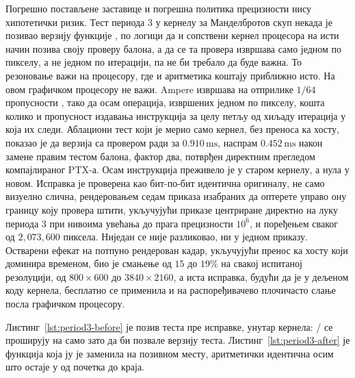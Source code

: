 \documentclass[serbian]{ftndiplomski}
\begin{document}
Погрешно постављене заставице и погрешна политика прецизности нису хипотетички ризик.
Тест периода 3 у  кернелу за Манделбротов скуп некада је позивао 
верзију функције , по логици да и сопствени  кернел
процесора на исти начин позива своју  проверу балона, а да се та провера
извршава само једном по пикселу, а не једном по итерацији, па не би требало да буде
важна. То резоновање важи на процесору, где  и  аритметика коштају
приближно исто. На овом графичком процесору не важи. Ampere извршава  на
отприлике $1/64$ пропусности , тако да осам  операција, извршених
једном по пикселу, кошта колико и пропусност издавања инструкција за целу петљу од
хиљаду итерација у  која их следи. Аблациони тест који је мерио само кернел,
без преноса ка хосту, показао је да верзија са  провером ради за
$0.910\,\mathrm{ms}$, наспрам $0.452\,\mathrm{ms}$ након замене правим 
тестом балона, фактор два, потврђен директним прегледом компајлираног PTX-а. Осам
 инструкција преживело је у старом кернелу, а нула у новом. Исправка је
проверена као бит-по-бит идентична оригиналу, не само визуелно слична, рендеровањем
седам приказа изабраних да оптерете управо ону границу коју провера штити, укључујући
приказе центриране директно на луку периода 3 при нивоима увећања до прага прецизности
$10^6$, и поређењем сваког од $2{,}073{,}600$ пиксела. Ниједан се није разликовао, ни
у једном приказу. Остварени ефекат на потпуно рендерован кадар, укључујући пренос ка
хосту који доминира временом, био је смањење од $15$ до $19\%$ на свакој испитаној
резолуцији, од $800\times600$ до $3840\times2160$, а иста исправка, будући да је у
дељеном коду кернела, бесплатно се применила и на распоређивачево плочичасто слање
посла графичком процесору.

Листинг~\ref{lst:period3-before} је позив теста пре исправке, унутар 
кернела: / се проширују на  само зато да би позвале
 верзију теста. Листинг~\ref{lst:period3-after} је функција која ју је
заменила на позивном месту, аритметички идентична осим што остаје у  од
почетка до краја.

\noindent\begin{minipage}{\linewidth}

\end{minipage}
\end{document}

